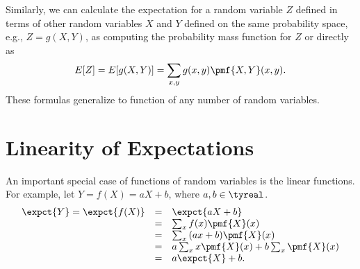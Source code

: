 \begin{cluster}
\label{grp:grm:probability::expectation::calculate}

\begin{gram}
\label{grm:probability::expectation::calculate}
Similarly, we can calculate the expectation for a random variable $Z$
defined in terms of other random variables $X$ and $Y$ defined on the
same probability space, e.g., $Z = g(X,Y)$, as computing the
probability mass function for $Z$ or directly as
\[
E[Z] = E[g(X,Y)] = \sum_{x,y}{g(x,y) \pmf{X,Y}(x,y)}.
\] 
These formulas generalize to function of any number of random
variables.

\end{gram}
\end{cluster}


\section{Linearity of Expectations}
\label{sec:probability::expectation::linearity}

\begin{cluster}
\label{grp:grm:probability::expectation::special}

\begin{gram}
\label{grm:probability::expectation::special}
An important special case of functions of random variables is the
linear functions.  For example, let $Y = f(X) = aX + b$, where $a, b
\in \tyreal$.
\[
\begin{array}{lll}
\expct{Y} = \expct{f(X)} 
& = & \expct{aX + b} 
\\
& = & \sum_{x}{f(x) \pmf{X}(x)}
\\
& = & \sum_{x}{(ax + b) \pmf{X}(x)}
\\
& = & a\sum_{x}{x\pmf{X}(x)} + b\sum_{x}{\pmf{X}(x)}
\\
& = & a\expct{X} + b.
\end{array}
\]

\end{gram}
\end{cluster}

